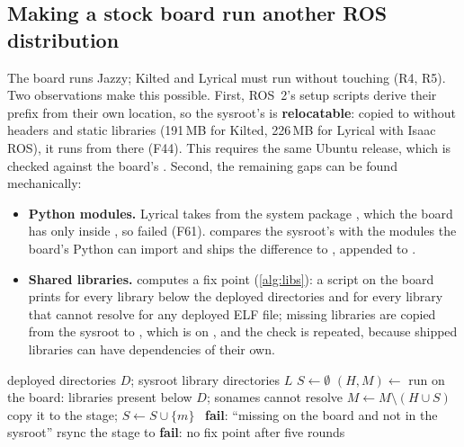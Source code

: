 \documentclass[11pt,a4paper]{article}
\newcommand{\codeb}[1]{\texttt{\detokenize{#1}}}      %
\newcommand{\finding}[1]{\textsf{\small F#1}}
\begin{document}
\subsection{Making a stock board run another ROS distribution}\label{sec:ship}
The board runs Jazzy; Kilted and Lyrical must run without touching  (R4, R5). Two observations make this
possible. First, ROS~2's setup scripts derive their prefix from their own location, so the sysroot's
 is \textbf{relocatable}: copied to  without
headers and static libraries (191\,MB for Kilted, 226\,MB for Lyrical with Isaac ROS), it runs from there
(\finding{44}). This requires the same Ubuntu release, which is checked against the board's
. Second, the remaining gaps can be found mechanically:
\begin{itemize}
  \item \textbf{Python modules.} Lyrical takes  from the system package
        , which the board has only inside , so 
        failed (\finding{61}).  compares the sysroot's  with the modules the
        board's Python can import and ships the difference to , appended to .
  \item \textbf{Shared libraries.}  computes a fix point (\cref{alg:libs}): a script on the board
        prints  for every library below the deployed directories and  for
        every library that  cannot resolve for any deployed ELF file; missing libraries are copied from the
        sysroot to , which is on , and the check is repeated, because
        shipped libraries can have dependencies of their own.
\end{itemize}

\begin{algorithm}[t]
\caption{Library closure on the board (\codeb{ensure_board_libs}).}\label{alg:libs}
\begin{algorithmic}[1]
\Require deployed directories $D$; sysroot library directories $L$
\State $S \gets \emptyset$ 
  \State $(H, M) \gets$ run on the board: libraries present below $D$; sonames  cannot resolve
  \State $M \gets M \setminus (H \cup S)$
   \Return {}
  \EndIf
     copy it to the stage; $S \gets S \cup \{m\}$
    \Else\ \textbf{fail}: \enquote{missing on the board and not in the sysroot}
    \EndIf
  \EndFor
  \State rsync the stage to 
\EndFor
\State \textbf{fail}: no fix point after five rounds
\end{algorithmic}
\end{algorithm}
\end{document}
